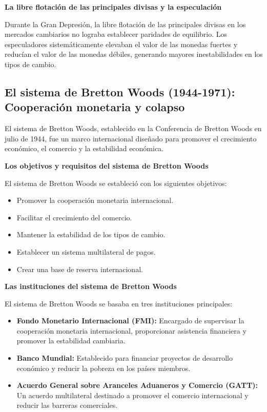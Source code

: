 \documentclass[
  letterpaper,
  DIV=11,
  numbers=noendperiod]{scrartcl}
\providecommand{\tightlist}{%
  \setlength{\itemsep}{0pt}\setlength{\parskip}{0pt}}\usepackage{longtable,booktabs,array}
\begin{document}
\textbf{La libre flotación de las principales divisas y la especulación}

Durante la Gran Depresión, la libre flotación de las principales divisas
en los mercados cambiarios no lograba establecer paridades de
equilibrio. Los especuladores sistemáticamente elevaban el valor de las
monedas fuertes y reducían el valor de las monedas débiles, generando
mayores inestabilidades en los tipos de cambio.

\hypertarget{el-sistema-de-bretton-woods-1944-1971-cooperaciuxf3n-monetaria-y-colapso}{%
\subsection{El sistema de Bretton Woods (1944-1971): Cooperación
monetaria y
colapso}\label{el-sistema-de-bretton-woods-1944-1971-cooperaciuxf3n-monetaria-y-colapso}}

El sistema de Bretton Woods, establecido en la Conferencia de Bretton
Woods en julio de 1944, fue un marco internacional diseñado para
promover el crecimiento económico, el comercio y la estabilidad
económica.

\textbf{Los objetivos y requisitos del sistema de Bretton Woods}

El sistema de Bretton Woods se estableció con los siguientes objetivos:

\begin{itemize}
\tightlist
\item
  Promover la cooperación monetaria internacional.
\item
  Facilitar el crecimiento del comercio.
\item
  Mantener la estabilidad de los tipos de cambio.
\item
  Establecer un sistema multilateral de pagos.
\item
  Crear una base de reserva internacional.
\end{itemize}

\textbf{Las instituciones del sistema de Bretton Woods}

El sistema de Bretton Woods se basaba en tres instituciones principales:

\begin{itemize}
\tightlist
\item
  \textbf{Fondo Monetario Internacional (FMI):} Encargado de supervisar
  la cooperación monetaria internacional, proporcionar asistencia
  financiera y promover la estabilidad cambiaria.
\item
  \textbf{Banco Mundial:} Establecido para financiar proyectos de
  desarrollo económico y reducir la pobreza en los países miembros.
\item
  \textbf{Acuerdo General sobre Aranceles Aduaneros y Comercio (GATT):}
  Un acuerdo multilateral destinado a promover el comercio internacional
  y reducir las barreras comerciales.
\end{itemize}
\end{document}
